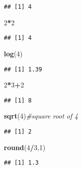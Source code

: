 \documentclass[]{book}
\newenvironment{Shaded}{\begin{snugshade}}{\end{snugshade}}
\newcommand{\KeywordTok}[1]{\textcolor[rgb]{0.13,0.29,0.53}{\textbf{#1}}}
\newcommand{\DecValTok}[1]{\textcolor[rgb]{0.00,0.00,0.81}{#1}}
\newcommand{\CommentTok}[1]{\textcolor[rgb]{0.56,0.35,0.01}{\textit{#1}}}
\newcommand{\OperatorTok}[1]{\textcolor[rgb]{0.81,0.36,0.00}{\textbf{#1}}}
\newcommand{\NormalTok}[1]{#1}
\theoremstyle{definition}
\theoremstyle{definition}
\theoremstyle{definition}
\theoremstyle{remark}
\begin{document}
\begin{verbatim}
## [1] 4
\end{verbatim}

\begin{Shaded}
\begin{Highlighting}[]
\DecValTok{2}\OperatorTok{*}\DecValTok{2}
\end{Highlighting}
\end{Shaded}

\begin{verbatim}
## [1] 4
\end{verbatim}

\begin{Shaded}
\begin{Highlighting}[]
\KeywordTok{log}\NormalTok{(}\DecValTok{4}\NormalTok{)}
\end{Highlighting}
\end{Shaded}

\begin{verbatim}
## [1] 1.39
\end{verbatim}

\begin{Shaded}
\begin{Highlighting}[]
\DecValTok{2}\OperatorTok{*}\DecValTok{3}\OperatorTok{+}\DecValTok{2}
\end{Highlighting}
\end{Shaded}

\begin{verbatim}
## [1] 8
\end{verbatim}

\begin{Shaded}
\begin{Highlighting}[]
\KeywordTok{sqrt}\NormalTok{(}\DecValTok{4}\NormalTok{)}\CommentTok{#square root of 4}
\end{Highlighting}
\end{Shaded}

\begin{verbatim}
## [1] 2
\end{verbatim}

\begin{Shaded}
\begin{Highlighting}[]
\KeywordTok{round}\NormalTok{(}\DecValTok{4}\OperatorTok{/}\DecValTok{3}\NormalTok{,}\DecValTok{1}\NormalTok{)}
\end{Highlighting}
\end{Shaded}

\begin{verbatim}
## [1] 1.3
\end{verbatim}
\end{document}
